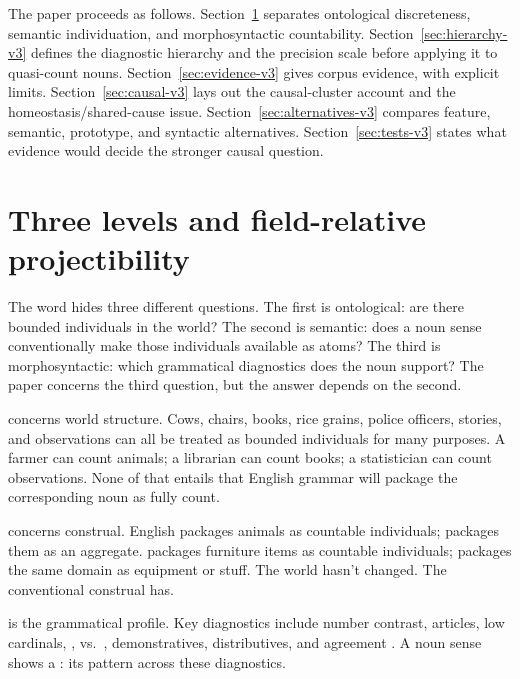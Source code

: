 \documentclass[12pt,a4paper]{article}
\begin{document}
The paper proceeds as follows. Section~\ref{sec:levels-v3} separates ontological discreteness, semantic individuation, and morphosyntactic countability. Section~\ref{sec:hierarchy-v3} defines the diagnostic hierarchy and the precision scale before applying it to quasi-count nouns. Section~\ref{sec:evidence-v3} gives corpus evidence, with explicit limits. Section~\ref{sec:causal-v3} lays out the causal-cluster account and the homeostasis/shared-cause issue. Section~\ref{sec:alternatives-v3} compares feature, semantic, prototype, and syntactic alternatives. Section~\ref{sec:tests-v3} states what evidence would decide the stronger causal question.

\section{Three levels and field-relative projectibility}\label{sec:levels-v3}

The word  hides three different questions. The first is ontological: are there bounded individuals in the world? The second is semantic: does a noun sense conventionally make those individuals available as atoms? The third is morphosyntactic: which grammatical diagnostics does the noun support? The paper concerns the third question, but the answer depends on the second.

 concerns world structure. Cows, chairs, books, rice grains, police officers, stories, and observations can all be treated as bounded individuals for many purposes. A farmer can count animals; a librarian can count books; a statistician can count observations. None of that entails that English grammar will package the corresponding noun as fully count.

 concerns construal. English  packages animals as countable individuals;  packages them as an aggregate.  packages furniture items as countable individuals;  packages the same domain as equipment or stuff. The world hasn't changed. The conventional construal has.

 is the grammatical profile. Key diagnostics include number contrast, articles, low cardinals, ,  vs.\ , demonstratives, distributives, and agreement \citep[pp.~333--336]{huddleston2002,allan1980}. A noun sense shows a : its pattern across these diagnostics.
\end{document}
